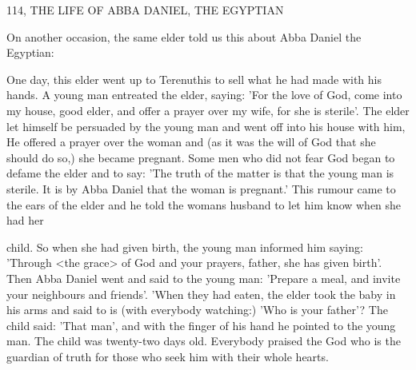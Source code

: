 114, THE LIFE OF ABBA DANIEL, THE EGYPTIAN

On another occasion, the same elder told us this about Abba Daniel
the Egyptian:

One day, this elder went up to Terenuthis to sell what he had made
with his hands.
A young man entreated the elder, saying: 'For the
love of God, come into my house, good elder, and offer a prayer
over my wife, for she is sterile'.
The elder let himself be persuaded
by the young man and went off into his house with him, He offered
a prayer over the woman and (as it was the will of God that she
should do so,) she became pregnant.
Some men who did not fear
God began to defame the elder and to say: 'The truth of the matter
is that the young man is sterile.
It is by Abba Daniel that the
woman is pregnant.' This rumour came to the ears of the elder and
he told the woman\textquotesingle s husband to let him know when she had her

child.
So when she had given birth, the young man informed him
saying: 'Through <the grace> of God and your prayers, father, she
has given birth'.
Then Abba Daniel went and said to the young
man: 'Prepare a meal, and invite your neighbours and friends'.
'When they had eaten, the elder took the baby in his arms and said
to is (with everybody watching:) 'Who is your father'? The child
said: 'That man', and with the finger of his hand he pointed to the
young man.
The child was twenty-two days old.
Everybody praised
the God who is the guardian of truth for those who seek him with
their whole hearts.

